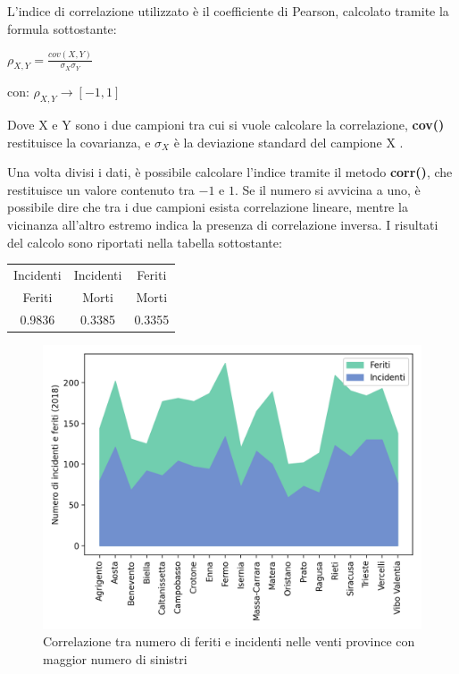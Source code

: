 \documentclass[a4paper,12pt]{report}
\newcommand{\methodstyle}[1]{\textbf{#1}}
\begin{document}
L'indice di correlazione utilizzato è il coefficiente di Pearson, 
calcolato tramite la formula sottostante: 

\begin{center}
    $\rho_{X, Y} = \displaystyle \frac{cov(X, Y)}{\sigma_X \sigma_Y}$
\end{center}

\begin{center}
    con: $\rho_{X, Y} \rightarrow [-1, 1]$
\end{center}

Dove X e Y sono i due campioni tra cui si vuole calcolare la correlazione, 
\methodstyle{cov()} restituisce la covarianza, e $\sigma_X$ è la deviazione standard del 
campione X \cite{PROB_E_STATISTICA:1}. 

Una volta divisi i dati, è possibile calcolare l'indice tramite il metodo 
\methodstyle{corr()}, che restituisce un valore contenuto tra $-1$ e $1$. 
Se il numero si avvicina a uno, è possibile dire che tra i due campioni esista correlazione 
lineare, mentre la vicinanza all'altro estremo indica la presenza di correlazione inversa. 
I risultati del calcolo sono riportati nella tabella sottostante: 

\begin{center}
    \def\arraystretch{1.5}%
    \begin{tabular}{ |c|c|c| } 
    \hline
    Incidenti & Incidenti & Feriti \\ 
    Feriti & Morti & Morti \\ 
    \hline
    0.9836 & 0.3385 & 0.3355 \\ 
    \hline
    \end{tabular}
\end{center}

\begin{figure}
    \includegraphics[width=\linewidth]{../src/incidenti/incidenti_aci/provincia/corr_incidenti.png}
    \caption{Correlazione tra numero di feriti e incidenti nelle venti province con maggior numero di sinistri}
    \label{fig:corr-incidenti-feriti}
\end{figure}
\end{document}
